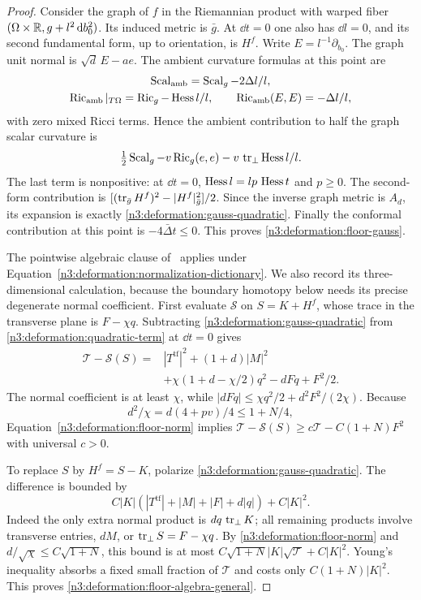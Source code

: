 \begin{proof}
Consider the graph of $f$ in the Riemannian product with warped fiber
$(\Omega\times\mathbb R,g+l^2\,\mathrm d b_0^2)$. Its induced metric is $\bar g$.
At $\dd t=0$ one also has $\dd l=0$, and its second fundamental form,
up to orientation, is $H^f$. Write $E=l^{-1}\partial_{b_0}$.
The graph unit normal is $\sqrt d\,E-ae$. The ambient curvature formulas
at this point are
\[
 \begin{gathered}
 \operatorname{Scal}_{\mathrm{amb}}=\operatorname{Scal}_g-2\Delta l/l,\\
 \operatorname{Ric}_{\mathrm{amb}}|_{T\Omega}=\operatorname{Ric}_g-\operatorname{Hess} l/l,\qquad
 \operatorname{Ric}_{\mathrm{amb}}(E,E)=-\Delta l/l,
 \end{gathered}
\]
with zero mixed Ricci terms. Hence the ambient contribution to half the
graph scalar curvature is
\[
 \tfrac12\operatorname{Scal}_g-v\operatorname{Ric}_g(e,e)
      -v\,\operatorname{tr}_\perp\operatorname{Hess} l/l.
\]
The last term is nonpositive: at $\dd t=0$,
$\operatorname{Hess} l=lp\,\operatorname{Hess} t$ and $p\ge0$.
The second-form contribution is
$[(\operatorname{tr}_{\bar g}H^f)^2-|H^f|_{\bar g}^2]/2$.
Since the inverse graph metric is $A_d$, its expansion is exactly
\eqref{n3:deformation:gauss-quadratic}.
Finally the conformal contribution at this point is
$-4\bar\Delta t\le0$. This proves \eqref{n3:deformation:floor-gauss}.

The pointwise algebraic clause of~\cite[Lemma~4.3]{NumericalCompanion} applies
under Equation~\eqref{n3:deformation:normalization-dictionary}. We also
record its three-dimensional calculation, because the boundary
homotopy below needs its precise degenerate normal coefficient. First evaluate $\mathcal S$ on
$S=K+H^f$, whose trace in the transverse plane is $F-\chi q$.
Subtracting \eqref{n3:deformation:gauss-quadratic} from
\eqref{n3:deformation:quadratic-term} at $\dd t=0$ gives
\begin{equation}\label{n3:deformation:floor-difference}
 \begin{split}
 \mathcal T-\mathcal S(S)
 ={}&|T^{\operatorname{tf}}|^2+(1+d)|M|^2\\
 &+\chi(1+d-\chi/2)q^2-dFq+F^2/2.
 \end{split}
\end{equation}
The normal coefficient is at least $\chi$, while
$|dFq|\le\chi q^2/2+d^2F^2/(2\chi)$.
Because
\[
 d^2/\chi=d(4+pv)/4\le1+N/4,
\]
Equation~\eqref{n3:deformation:floor-norm} implies
$\mathcal T-\mathcal S(S)\ge c\mathcal T-C(1+N)F^2$
with universal $c>0$.

To replace $S$ by $H^f=S-K$, polarize
\eqref{n3:deformation:gauss-quadratic}. The difference is bounded by
\[
 C|K|(|T^{\operatorname{tf}}|+|M|+|F|+d|q|)+C|K|^2.
\]
Indeed the only extra normal product is $dq\,\operatorname{tr}_\perp K$;
all remaining products involve transverse entries, $dM$, or
$\operatorname{tr}_\perp S=F-\chi q$.
By \eqref{n3:deformation:floor-norm} and $d/\sqrt\chi\le C\sqrt{1+N}$,
this bound is at most
$C\sqrt{1+N}|K|\sqrt{\mathcal T}+C|K|^2$.
Young's inequality absorbs a fixed small fraction of $\mathcal T$
and costs only $C(1+N)|K|^2$. This proves
\eqref{n3:deformation:floor-algebra-general}.


\end{proof}
